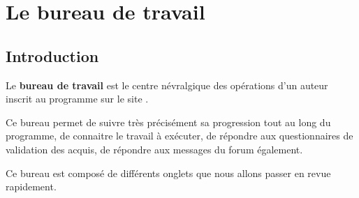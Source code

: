 % 
% 
% 
% 
% 
% 
% 
% 

\chapter{Le bureau de travail}\hypertarget{bureau}{}\label{bureau}

\section{Introduction}\hypertarget{introduction-bureau}{}\label{introduction-bureau}

Le \textbf{bureau de travail} est le centre névralgique des opérations d'un auteur inscrit au programme \unan{} sur le site \boa{}.

Ce bureau permet de suivre très précisément sa progression tout au long du programme, de connaitre le travail à exécuter, de répondre aux questionnaires de validation des acquis, de répondre aux messages du forum également.

Ce bureau est composé de différents onglets que nous allons passer en revue rapidement.

